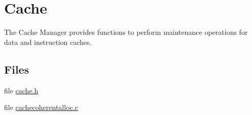 \hypertarget{group__ClassicCache}{}\section{Cache}
\label{group__ClassicCache}


The Cache Manager provides functions to perform maintenance operations for data and instruction caches.  


\subsection*{Files}
\begin{DoxyCompactItemize}
\item 
file \mbox{\hyperlink{cpukit_2include_2rtems_2rtems_2cache_8h}{cache.\+h}}
\item 
file \mbox{\hyperlink{cachecoherentalloc_8c}{cachecoherentalloc.\+c}}
\end{DoxyCompactItemize}
